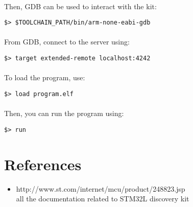 \documentclass[a4paper, 11pt]{article}
\begin{document}
\paragraph{}
Then, GDB can be used to interact with the kit:\\
\begin{small}
\begin{lstlisting}[frame=tb]
$> $TOOLCHAIN_PATH/bin/arm-none-eabi-gdb
\end{lstlisting}
\end{small}

\paragraph{}
From GDB, connect to the server using:\\
\begin{small}
\begin{lstlisting}[frame=tb]
$> target extended-remote localhost:4242
\end{lstlisting}
\end{small}

\paragraph{}
To load the program, use:\\
\begin{small}
\begin{lstlisting}[frame=tb]
$> load program.elf
\end{lstlisting}
\end{small}

\paragraph{}
Then, you can run the program using:\\
\begin{small}
\begin{lstlisting}[frame=tb]
$> run
\end{lstlisting}
\end{small}


\newpage
\section{References}
\begin{itemize}
\item http://www.st.com/internet/mcu/product/248823.jsp\\
  all the documentation related to STM32L discovery kit
\end{itemize}
\end{document}
